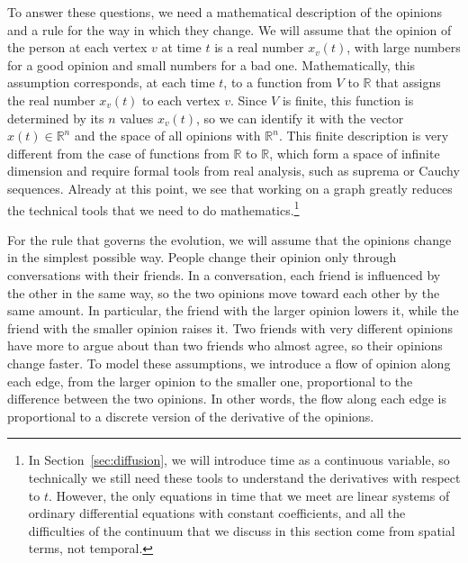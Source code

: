 \documentclass[11pt,a4paper]{article}
\theoremstyle{plain}
\theoremstyle{definition}
\newcommand{\R}{\mathbb{R}}
\begin{document}
To answer these questions, we need a mathematical description of the opinions and a rule for the way in which they change. We will assume that the opinion of the person at each vertex $v$ at time $t$ is a real number $x_v(t)$, with large numbers for a good opinion and small numbers for a bad one. Mathematically, this assumption corresponds, at each time $t$, to a function from $V$ to $\R$ that assigns the real number $x_v(t)$ to each vertex $v$. Since $V$ is finite, this function is determined by its $n$ values $x_v(t)$, so we can identify it with the vector $x(t)\in\R^n$ and the space of all opinions with $\R^n$. This finite description is very different from the case of functions from $\R$ to $\R$, which form a space of infinite dimension and require formal tools from real analysis, such as suprema or Cauchy sequences. Already at this point, we see that working on a graph greatly reduces the technical tools that we need to do mathematics.\footnote{In Section~\ref{sec:diffusion}, we will introduce time as a continuous variable, so technically we still need these tools to understand the derivatives with respect to $t$. However, the only equations in time that we meet are linear systems of ordinary differential equations with constant coefficients, and all the difficulties of the continuum that we discuss in this section come from spatial terms, not temporal.}

For the rule that governs the evolution, we will assume that the opinions change in the simplest possible way. People change their opinion only through conversations with their friends. In a conversation, each friend is influenced by the other in the same way, so the two opinions move toward each other by the same amount. In particular, the friend with the larger opinion lowers it, while the friend with the smaller opinion raises it. Two friends with very different opinions have more to argue about than two friends who almost agree, so their opinions change faster. To model these assumptions, we introduce a flow of opinion along each edge, from the larger opinion to the smaller one, proportional to the difference between the two opinions. In other words, the flow along each edge is proportional to a discrete version of the derivative of the opinions.
\end{document}
